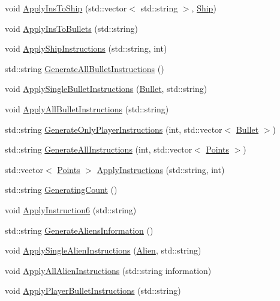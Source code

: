 \begin{DoxyCompactItemize}
\item 
void \hyperlink{classBoard_acf3771b990df448feead07a91cd2d875}{Apply\-Ins\-To\-Ship} (std\-::vector$<$ std\-::string $>$, \hyperlink{classShip}{Ship})
\item 
void \hyperlink{classBoard_a23172bed8d2c37d924160bfa2f7ce5d6}{Apply\-Ins\-To\-Bullets} (std\-::string)
\item 
void \hyperlink{classBoard_a3f6988dceae7aaffc1b81a019b98e6fd}{Apply\-Ship\-Instructions} (std\-::string, int)
\item 
std\-::string \hyperlink{classBoard_a3af7dcf1ed2916ee831b06342ee17ab4}{Generate\-All\-Bullet\-Instructions} ()
\item 
void \hyperlink{classBoard_ae3a6257c9312f10907e4df3e08a75073}{Apply\-Single\-Bullet\-Instructions} (\hyperlink{classBullet}{Bullet}, std\-::string)
\item 
void \hyperlink{classBoard_aa60144e2c1af9154229961198917ce56}{Apply\-All\-Bullet\-Instructions} (std\-::string)
\item 
std\-::string \hyperlink{classBoard_a04b03e340f5b074f9129173575ba46b9}{Generate\-Only\-Player\-Instructions} (int, std\-::vector$<$ \hyperlink{classBullet}{Bullet} $>$)
\item 
std\-::string \hyperlink{classBoard_a210c0bcf1937c0ba0d8198cff40c232d}{Generate\-All\-Instructions} (int, std\-::vector$<$ \hyperlink{structPoints}{Points} $>$)
\item 
std\-::vector$<$ \hyperlink{structPoints}{Points} $>$ \hyperlink{classBoard_a37cf5ff03bda32c6c73aa6faefde92cd}{Apply\-Instructions} (std\-::string, int)
\item 
std\-::string \hyperlink{classBoard_abe8f70187c975e5e68b92bc5f5446e70}{Generating\-Count} ()
\item 
void \hyperlink{classBoard_aea97ca6513d5759d9eb37c9483e45367}{Apply\-Instruction6} (std\-::string)
\item 
std\-::string \hyperlink{classBoard_a7a4906d19da2e17681df238496d9a310}{Generate\-Aliens\-Information} ()
\item 
void \hyperlink{classBoard_a0f7f494542205d13cc2db1001ca5ca26}{Apply\-Single\-Alien\-Instructions} (\hyperlink{classAlien}{Alien}, std\-::string)
\item 
void \hyperlink{classBoard_a489defda1d454e9966523c307ff0d782}{Apply\-All\-Alien\-Instructions} (std\-::string information)
\item 
void \hyperlink{classBoard_a2312c88b4aa6d2d7a8bcab885fc19616}{Apply\-Player\-Bullet\-Instructions} (std\-::string)

\end{DoxyCompactItemize}
